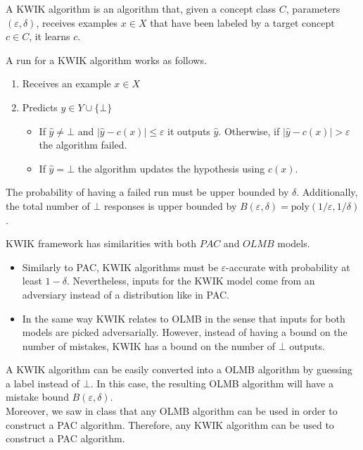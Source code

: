 A KWIK algorithm is an algorithm that, given a concept class $C$, parameters $(\varepsilon, \delta)$,  receives examples $x \in X$ that have been labeled by a target concept $c \in C$, it learns $c$.

A run for a KWIK algorithm works as follows.
\begin{enumerate}
  \item Receives an example $x \in X$
  \item Predicts $\hat{y} \in Y \cup \{\bot\}$
    \begin{itemize}
      \item If $\hat{y} \neq \bot$ and $|\hat{y} - c(x)| \leq \varepsilon$ it outputs $\hat{y}$. Otherwise, if $|\hat{y} - c(x)| > \varepsilon$ the algorithm failed.
      \item If $\hat{y} = \bot$ the algorithm updates the hypothesis using $c(x)$.
    \end{itemize}
\end{enumerate}

The probability of having a failed run must be upper bounded by $\delta$. Additionally, the total number of $\bot$ responses is upper bounded by $B(\varepsilon,\delta)=\text{poly}(1/\varepsilon,1/\delta)$.

KWIK framework has similarities with both $PAC$ and $OLMB$ models.
\begin{itemize}
  \item Similarly to PAC, KWIK algorithms must be $\varepsilon$-accurate with probability at least $1-\delta$. Nevertheless, inputs for the KWIK model come from an adversiary instead of a distribution like in PAC.
  \item In the same way KWIK relates to OLMB in the sense that inputs for both models are picked adversarially. However, instead of having a bound on the number of mistakes, KWIK has a bound on the number of $\bot$ outputs.
\end{itemize}

A KWIK algorithm can be easily converted into a OLMB algorithm by guessing a label instead of $\bot$. In this case, the resulting OLMB algorithm will have a mistake bound $B(\varepsilon,\delta)$.\\

Moreover, we saw in class that any OLMB algorithm can be used in order to construct a PAC algorithm. Therefore, any KWIK algorithm can be used to construct a PAC algorithm.

